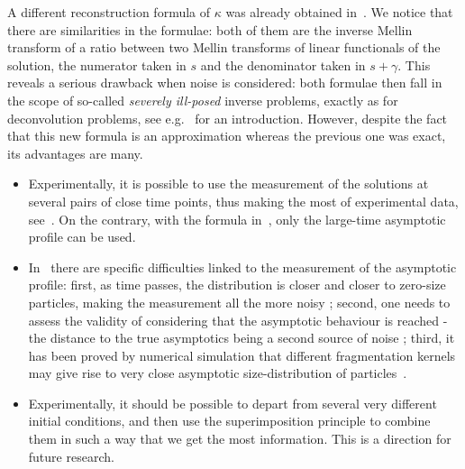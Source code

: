 \documentclass[AHL,Unicode,longabstracts,published]{cedram}
\begin{document}
A different reconstruction formula of $\kappa $ was already obtained in~\cite[Theorem~2, (iii)]{DET18}. We notice that there are similarities in the formulae: both of them are the inverse Mellin transform of a ratio between two Mellin transforms of linear functionals of the solution, the numerator taken in $s$ and the denominator taken in $s+\gamma.$ This reveals a serious drawback when noise is considered: both formulae then fall in the scope of so-called \emph{severely ill-posed} inverse problems, exactly as for deconvolution problems, see e.g.~\cite[Chapter~4]{Baumeister_book} for an introduction. However, despite the fact that this new formula is an approximation whereas the previous one was exact, its advantages are many.
\begin{itemize}
\item Experimentally, it is possible to use the measurement of the solutions at several pairs of close time points, thus making the most of experimental data, see~\cite{BTMPSTDX19}. On the contrary, with the formula in~\cite{DET18}, only the large-time asymptotic profile can be used.
\item In~\cite{DET18} there are specific difficulties linked to the measurement of the asymptotic profile: first, as time passes, the distribution is closer and closer to zero-size particles, making the measurement all the more noisy ; second, one needs to assess the validity of considering that the asymptotic behaviour is reached - the distance to the true asymptotics being a second source of noise ; third, it has been proved by numerical simulation that different fragmentation kernels may give rise to very close asymptotic size-distribution of particles~\cite{DETX20}.
\item Experimentally, it should be possible to depart from several very different initial conditions, and then use the superimposition principle to combine them in such a way that we get the most information. This is a direction for future research.
\end{itemize}
\end{document}
